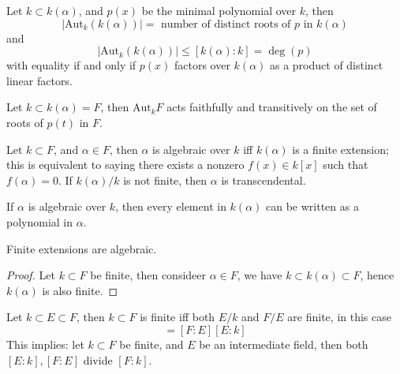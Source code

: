 \documentclass[openany]{book}
\newcommand{\aut}{\text{Aut}}
\begin{document}
\begin{prop}
    Let $k\subset k(\alpha)$, and $p(x)$ be the minimal polynomial over $k$, then 
    \begin{equation*}
        |\text{Aut}_k(k(\alpha))|=\text{ number of distinct roots of $p$ in $k(\alpha)$}
    \end{equation*}
    and 
    \begin{equation*}
        |\text{Aut}_k(k(\alpha))|\leq [k(\alpha):k]=\deg(p)
    \end{equation*}
    with equality if and only if $p(x)$ factors over $k(\alpha)$ as a product of distinct linear factors.
\end{prop}

\begin{prop}
    Let $k\subset k(\alpha)=F$, then $\aut_kF$ acts faithfully and transitively on the set of roots of $p(t)$ in $F$. 
\end{prop}

\begin{defn}
    Let $k\subset F$, and $\alpha\in F$, then $\alpha$ is algebraic over $k$ iff $k(\alpha)$ is a finite extension; this is equivalent to saying there exists a nonzero $f(x)\in k[x]$ such that $f(\alpha)=0$. If $k(\alpha)/k$ is not finite, then $\alpha$ is transcendental.

    If $\alpha$ is algebraic over $k$, then every element in $k(\alpha)$ can be written as a polynomial in $\alpha$.
\end{defn}


\begin{prop}
    Finite extensions are algebraic.
\end{prop}
\begin{proof}
    Let $k\subset F$ be finite, then consideer $\alpha\in F$, we have $k\subset k(\alpha)\subset F$, hence $k(\alpha)$ is also finite.
\end{proof}



\begin{prop}
    Let $k\subset E\subset F$, then $k\subset F$ is finite iff both $E/k$ and $F/E$ are finite, in this case 
    \begin{equation*}
        [F:k]=[F:E][E:k]
    \end{equation*}
    This implies: let $k\subset F$ be finite, and $E$ be an intermediate field, then both $[E:k],[F:E]$ divide $[F:k]$.
\end{prop}
\end{document}
